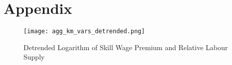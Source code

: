 \documentclass[11pt]{article}
\begin{document}




















\newpage
\section{Appendix}



\begin{figure}[!htbp]%
    \centering
    \caption{Detrended Logarithm of Skill Wage Premium and Relative Labour Supply}
    {\texttt{[image: agg\_km\_vars\_detrended.png]} }
    \label{agg_km_vars_detrended}
\end{figure}
\end{document}
